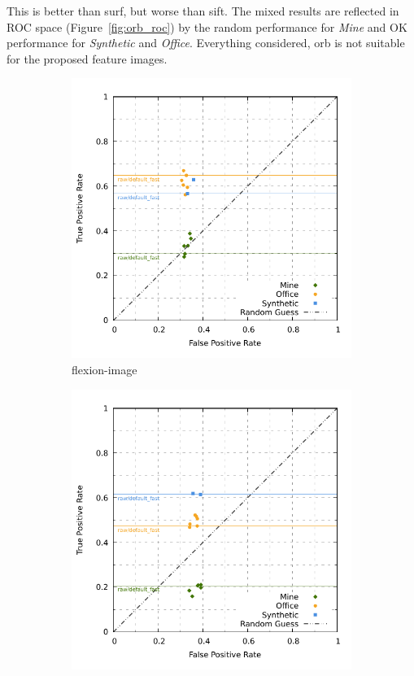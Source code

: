 This is better than \acrshort{surf}, but worse than \acrshort{sift}.
The mixed results are reflected in ROC space (Figure~\ref{fig:orb_roc}) by the random performance for \emph{Mine} and OK performance for \emph{Synthetic} and \emph{Office}.
Everything considered, \acrshort{orb} is not suitable for the proposed feature images.
\begin{figure}[H]
\begin{subfigure}[t]{0.45\linewidth}
    \includegraphics[width=\linewidth]{chapter06/results/ORB/flexion/roc.pdf}%
    \caption{\gls{flexion-image}}
\end{subfigure}\quad
\begin{subfigure}[t]{0.45\linewidth}
    \includegraphics[width=\linewidth]{chapter06/results/ORB/bearing/roc.pdf}

\end{subfigure}
\end{figure}
